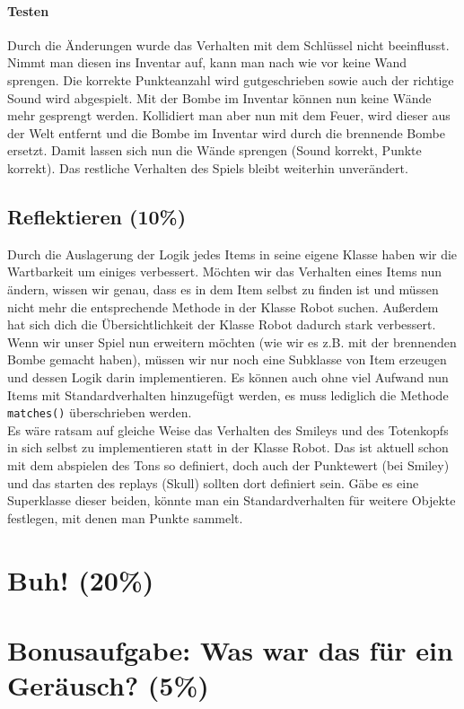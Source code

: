 \documentclass{pi1}
\begin{document}
\paragraph{Testen} Durch die Änderungen wurde das Verhalten mit dem Schlüssel nicht beeinflusst. Nimmt man diesen ins Inventar auf, kann man nach wie vor keine Wand sprengen. Die korrekte Punkteanzahl wird gutgeschrieben sowie auch der richtige Sound wird abgespielt. Mit der Bombe im Inventar können nun keine Wände mehr gesprengt werden. Kollidiert man aber nun mit dem Feuer, wird dieser aus der Welt entfernt und die Bombe im Inventar wird durch die brennende Bombe ersetzt. Damit lassen sich nun die Wände sprengen (Sound korrekt, Punkte korrekt). Das restliche Verhalten des Spiels bleibt weiterhin unverändert.

\subsection{Reflektieren (10\%)}

Durch die Auslagerung der Logik jedes Items in seine eigene Klasse haben wir die Wartbarkeit um einiges verbessert. Möchten wir das Verhalten eines Items nun ändern, wissen wir genau, dass es in dem Item selbst zu finden ist und müssen nicht mehr die entsprechende Methode in der Klasse Robot suchen. Außerdem hat sich dich die Übersichtlichkeit der Klasse Robot dadurch stark verbessert.\\
Wenn wir unser Spiel nun erweitern möchten (wie wir es z.B. mit der brennenden Bombe gemacht haben), müssen wir nur noch eine Subklasse von Item erzeugen und dessen Logik darin implementieren. Es können auch ohne viel Aufwand nun Items mit Standardverhalten hinzugefügt werden, es muss lediglich die Methode \texttt{matches()} überschrieben werden.\\
Es wäre ratsam auf gleiche Weise das Verhalten des Smileys und des Totenkopfs in sich selbst zu implementieren statt in der Klasse Robot. Das ist aktuell schon mit dem abspielen des Tons so definiert, doch auch der Punktewert (bei Smiley) und das starten des replays (Skull) sollten dort definiert sein. Gäbe es eine Superklasse dieser beiden, könnte man ein Standardverhalten für weitere Objekte festlegen, mit denen man Punkte sammelt.

\section{Buh! (20\%)}

\section{Bonusaufgabe: Was war das für ein Geräusch? (5\%)}
\end{document}
